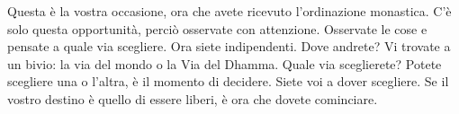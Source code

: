 Questa è la vostra occasione, ora che avete ricevuto l'ordinazione
monastica. C'è solo questa opportunità, perciò osservate con attenzione.
Osservate le cose e pensate a quale via scegliere. Ora siete
indipendenti. Dove andrete? Vi trovate a un bivio: la via del mondo o la
Via del Dhamma. Quale via sceglierete? Potete scegliere una o l'altra, è
il momento di decidere. Siete voi a dover scegliere. Se il vostro
destino è quello di essere liberi, è ora che dovete cominciare.

